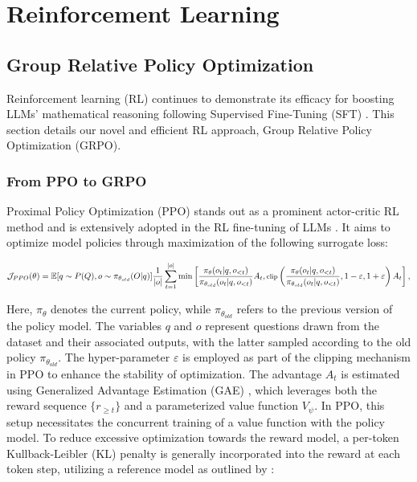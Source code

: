 \section{Reinforcement Learning}

\subsection{Group Relative Policy Optimization} Reinforcement learning (RL) continues to demonstrate its efficacy for boosting LLMs’ mathematical reasoning following Supervised Fine-Tuning (SFT) \citep{wang2023math,wizardmath}. This section details our novel and efficient RL approach, Group Relative Policy Optimization (GRPO).

\subsubsection{From PPO to GRPO} Proximal Policy Optimization (PPO) \citep{schulman2017proximal} stands out as a prominent actor-critic RL method and is extensively adopted in the RL fine-tuning of LLMs \citep{ouyang2022training}. It aims to optimize model policies through maximization of the following surrogate loss:

\begin{equation}
\footnotesize
    \mathcal{J}_{PPO}(\theta) = \mathbb{E}{[q \sim P(Q), o \sim \pi_{\theta_{old}}(O|q)]} \frac{1}{|o|} \sum_{t=1}^{|o|} \min \left[ \frac{\pi_\theta(o_{t} | q, o_{<t})}{\pi_{\theta_{old}}(o_{t} | q, o_{<t})} A_{t}, \text{clip} \left( \frac{\pi_\theta(o_{t} | q, o_{<t})}{\pi_{\theta_{old}}(o_{t} | q, o_{<t})}, 1 - \varepsilon, 1 + \varepsilon \right)  A_{t} \right] ,
\end{equation}

Here, $\pi_{\theta}$ denotes the current policy, while $\pi_{\theta_{old}}$ refers to the previous version of the policy model. The variables $q$ and $o$ represent questions drawn from the dataset and their associated outputs, with the latter sampled according to the old policy $\pi_{\theta_{old}}$. The hyper-parameter $\varepsilon$ is employed as part of the clipping mechanism in PPO to enhance the stability of optimization. The advantage $A_t$ is estimated using Generalized Advantage Estimation (GAE) \citep{gae}, which leverages both the reward sequence $\{r_{\ge t}\}$ and a parameterized value function $V_{\psi}$. In PPO, this setup necessitates the concurrent training of a value function with the policy model. To reduce excessive optimization towards the reward model, a per-token Kullback-Leibler (KL) penalty is generally incorporated into the reward at each token step, utilizing a reference model as outlined by \citep{ouyang2022training}:

